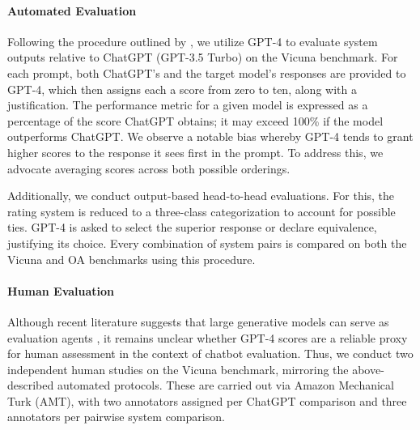 \paragraph{Automated Evaluation} Following the procedure outlined by \citet{vicuna2023}, we utilize GPT-4 to evaluate system outputs relative to ChatGPT (GPT-3.5 Turbo) on the Vicuna benchmark. For each prompt, both ChatGPT’s and the target model’s responses are provided to GPT-4, which then assigns each a score from zero to ten, along with a justification. The performance metric for a given model is expressed as a percentage of the score ChatGPT obtains; it may exceed 100\% if the model outperforms ChatGPT. We observe a notable bias whereby GPT-4 tends to grant higher scores to the response it sees first in the prompt. To address this, we advocate averaging scores across both possible orderings.

Additionally, we conduct output-based head-to-head evaluations. For this, the rating system is reduced to a three-class categorization to account for possible ties. GPT-4 is asked to select the superior response or declare equivalence, justifying its choice. Every combination of system pairs is compared on both the Vicuna and OA benchmarks using this procedure.

\paragraph{Human Evaluation} Although recent literature suggests that large generative models can serve as evaluation agents \citep{fu2023gptscore}, it remains unclear whether GPT-4 scores are a reliable proxy for human assessment in the context of chatbot evaluation. Thus, we conduct two independent human studies on the Vicuna benchmark, mirroring the above-described automated protocols. These are carried out via Amazon Mechanical Turk (AMT), with two annotators assigned per ChatGPT comparison and three annotators per pairwise system comparison.


